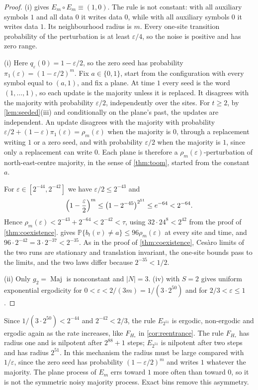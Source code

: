 \documentclass[11pt]{article}
\theoremstyle{plain}
\theoremstyle{definition}
\theoremstyle{remark}
\newcommand{\Prob}{\mathbb P}
\newcommand{\eps}{\varepsilon}
\newcommand{\Maj}{\operatorname{Maj}}
\begin{document}
\begin{proof}
(i) gives $E_m\circ E_m\equiv(1,0)$. The rule is not constant: with all auxiliary symbols $1$ and all data $0$ it writes data $0$, while with all auxiliary symbols $0$ it writes data $1$. Its neighbourhood radius is $m$. Every one-site transition probability of the perturbation is at least $\eps/4$, so the noise is positive and has zero range.

(i) Here $q_\eps(0)=1-\eps/2$, so the zero seed has probability $\pi_1(\eps)=(1-\eps/2)^m$. Fix $a\in\{0,1\}$, start from the configuration with every symbol equal to $(a,1)$, and fix a plane. At time $1$ every seed is the word $(1,\ldots,1)$, so each update is the majority unless it is replaced. It disagrees with the majority with probability $\eps/2$, independently over the sites. For $t\geq2$, by \cref{lem:seeded}(iii) and conditionally on the plane's past, the updates are independent. An update disagrees with the majority with probability $\eps/2+(1-\eps)\pi_1(\eps)=\rho_m(\eps)$ when the majority is $0$, through a replacement writing $1$ or a zero seed, and with probability $\eps/2$ when the majority is $1$, since only a replacement can write $0$. Each plane is therefore a $\rho_m(\eps)$-perturbation of north-east-centre majority, in the sense of \cref{thm:toom}, started from the constant $a$.

For $\eps\in[2^{-44},2^{-42}]$ we have $\eps/2\leq2^{-43}$ and
\[
 \Bigl(1-\frac\eps2\Bigr)^m\leq\bigl(1-2^{-45}\bigr)^{2^{51}}\leq e^{-64}<2^{-64}.
\]
Hence $\rho_m(\eps)<2^{-43}+2^{-64}<2^{-42}<\tau$, using $32\cdot24^8<2^{42}$ from the proof of \cref{thm:coexistence}.  gives $\Prob\{b_t(v)\ne a\}\leq96\rho_m(\eps)$ at every site and time, and $96\cdot2^{-42}=3\cdot2^{-37}<2^{-35}$. As in the proof of \cref{thm:coexistence}, Ces\`aro limits of the two runs are stationary and translation invariant, the one-site bounds pass to the limits, and the two laws differ because $2^{-35}<1/2$.

(ii) Only $g_2=\Maj$ is nonconstant and $|N|=3$. (iv) with $S=2$ gives uniform exponential ergodicity for $0<\eps<2/(3m)=1/(3\cdot2^{50})$ and for $2/3<\eps\leq1$.
\end{proof}

Since $1/(3\cdot2^{50})<2^{-44}$ and $2^{-42}<2/3$, the rule $E_{2^{51}}$ is ergodic, non-ergodic and ergodic again as the rate increases, like $F_{H_*}$ in \cref{cor:reentrance}. The rule $F_{H_*}$ has radius one and is nilpotent after $2^{88}+1$ steps; $E_{2^{51}}$ is nilpotent after two steps and has radius $2^{51}$. In this mechanism the radius must be large compared with $1/\eps$, since the zero seed has probability $(1-\eps/2)^m$ and writes $1$ whatever the majority. The plane process of $E_m$ errs toward $1$ more often than toward $0$, so it is not the symmetric noisy majority process. Exact bins remove this asymmetry.
\end{document}
